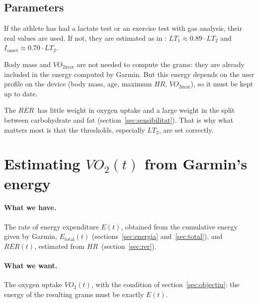 \documentclass[10pt,a4paper]{article}
\newcommand{\sub}[1]{{\scriptscriptstyle\mathrm{#1}}}   %
\newcommand{\tot}{\sub{total}}
\newcommand{\smax}{{\scriptscriptstyle\text{max}}}
\newcommand{\VO}{\ensuremath{\mathit{VO}_2}}               %
\newcommand{\VOmax}{\ensuremath{\mathit{VO}_{2\smax}}}
\newcommand{\RER}{\ensuremath{\mathit{RER}}}
\newcommand{\FC}{\ensuremath{\mathit{HR}}}
\newcommand{\Ion}{\ensuremath{I_{\mathrm{onset}}}}
\begin{document}
\subsection{Parameters}\label{sec:parametres}
If the athlete has had a lactate test or an exercise test with gas analysis, their real
values are used. If not, they are estimated as in \citep{chofatfc2026}:
$LT_1\approx0.89\cdot LT_2$ and $\Ion\approx0.70\cdot LT_2$.

Body mass and $\VOmax$ are not needed to compute the grams: they are already included in the
energy computed by Garmin. But this energy depends on the user profile on the device (body
mass, age, maximum \FC, $\VOmax$), so it must be kept up to date.

The \RER\ has little weight in oxygen uptake and a large weight in the split between
carbohydrate and fat (section~\ref{sec:sensibilitat}). That is why what matters most is
that the thresholds, especially $LT_2$, are set correctly.

\section{Estimating \texorpdfstring{$\mathit{VO}_2(t)$}{VO2(t)} from Garmin's energy}\label{sec:vo2}

\paragraph{What we have.} The rate of energy expenditure $E(t)$, obtained from the
cumulative energy given by Garmin, $E_{\tot}(t)$ (sections~\ref{sec:energia}
and~\ref{sec:total}), and $\RER(t)$, estimated from \FC\ (section~\ref{sec:rer}).

\paragraph{What we want.} The oxygen uptake $\VO(t)$, with the condition of
section~\ref{sec:objectiu}: the energy of the resulting grams must be exactly $E(t)$.
\end{document}

